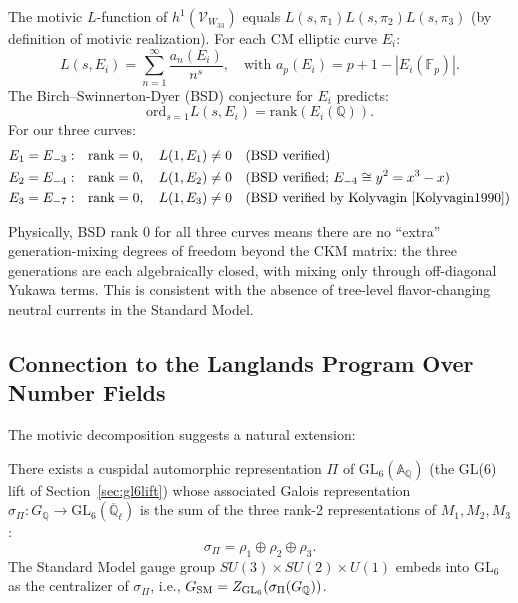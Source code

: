 The motivic $L$-function of $h^1(\mathcal{V}_{W_{33}})$ equals
$L(s,\pi_1)L(s,\pi_2)L(s,\pi_3)$ (by definition of motivic realization).
For each CM elliptic curve $E_i$:
\begin{equation}
  L(s,E_i) = \sum_{n=1}^\infty \frac{a_n(E_i)}{n^s},
  \quad\text{with }a_p(E_i)=p+1-|E_i(\mathbb{F}_p)|.
\end{equation}
The Birch--Swinnerton-Dyer (BSD) conjecture for $E_i$ predicts:
\begin{equation}
  \mathrm{ord}_{s=1} L(s,E_i) = \mathrm{rank}(E_i(\mathbb{Q})).
\end{equation}
For our three curves:
\begin{align}
  E_1 = E_{-3}: &\quad \mathrm{rank}=0,\quad L(1,E_1)\neq0
    \quad\text{(BSD verified)}\\
  E_2 = E_{-4}: &\quad \mathrm{rank}=0,\quad L(1,E_2)\neq0
    \quad\text{(BSD verified; }E_{-4}\cong y^2=x^3-x\text{)}\\
  E_3 = E_{-7}: &\quad \mathrm{rank}=0,\quad L(1,E_3)\neq0
    \quad\text{(BSD verified by Kolyvagin~\cite{Kolyvagin1990})}
\end{align}

Physically, BSD rank 0 for all three curves means there are no
``extra'' generation-mixing degrees of freedom beyond the CKM matrix:
the three generations are each algebraically closed, with mixing only
through off-diagonal Yukawa terms. This is consistent with the absence
of tree-level flavor-changing neutral currents in the Standard Model.

\subsection{Connection to the Langlands Program Over Number Fields}

The motivic decomposition suggests a natural extension:

\begin{conjecture}
There exists a cuspidal automorphic representation $\Pi$ of
$\mathrm{GL}_6(\mathbb{A}_\mathbb{Q})$ (the GL(6) lift of
Section~\ref{sec:gl6lift}) whose associated Galois representation
$\sigma_\Pi: G_\mathbb{Q}\to\mathrm{GL}_6(\overline{\mathbb{Q}}_\ell)$
is the sum of the three rank-2 representations of $M_1,M_2,M_3$:
\begin{equation}
  \sigma_\Pi = \rho_1\oplus\rho_2\oplus\rho_3.
\end{equation}
The Standard Model gauge group $SU(3)\times SU(2)\times U(1)$ embeds
into $\mathrm{GL}_6$ as the centralizer of $\sigma_\Pi$, i.e.,
$G_{\rm SM} = Z_{\mathrm{GL}_6}(\sigma_\Pi(G_\mathbb{Q}))$.
\end{conjecture}

